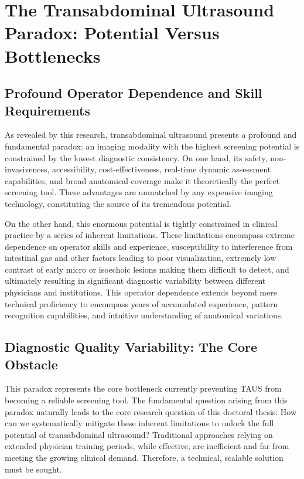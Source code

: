 \section{The Transabdominal Ultrasound Paradox: Potential Versus Bottlenecks}

\subsection{Profound Operator Dependence and Skill Requirements}

As revealed by this research, transabdominal ultrasound presents a profound and fundamental paradox: an imaging modality with the highest screening potential is constrained by the lowest diagnostic consistency. On one hand, its safety, non-invasiveness, accessibility, cost-effectiveness, real-time dynamic assessment capabilities, and broad anatomical coverage make it theoretically the perfect screening tool. These advantages are unmatched by any expensive imaging technology, constituting the source of its tremendous potential.

On the other hand, this enormous potential is tightly constrained in clinical practice by a series of inherent limitations. These limitations encompass extreme dependence on operator skills and experience, susceptibility to interference from intestinal gas and other factors leading to poor visualization, extremely low contrast of early micro or isoechoic lesions making them difficult to detect, and ultimately resulting in significant diagnostic variability between different physicians and institutions. This operator dependence extends beyond mere technical proficiency to encompass years of accumulated experience, pattern recognition capabilities, and intuitive understanding of anatomical variations.

\subsection{Diagnostic Quality Variability: The Core Obstacle}

This paradox represents the core bottleneck currently preventing TAUS from becoming a reliable screening tool. The fundamental question arising from this paradox naturally leads to the core research question of this doctoral thesis: How can we systematically mitigate these inherent limitations to unlock the full potential of transabdominal ultrasound? Traditional approaches relying on extended physician training periods, while effective, are inefficient and far from meeting the growing clinical demand. Therefore, a technical, scalable solution must be sought.

